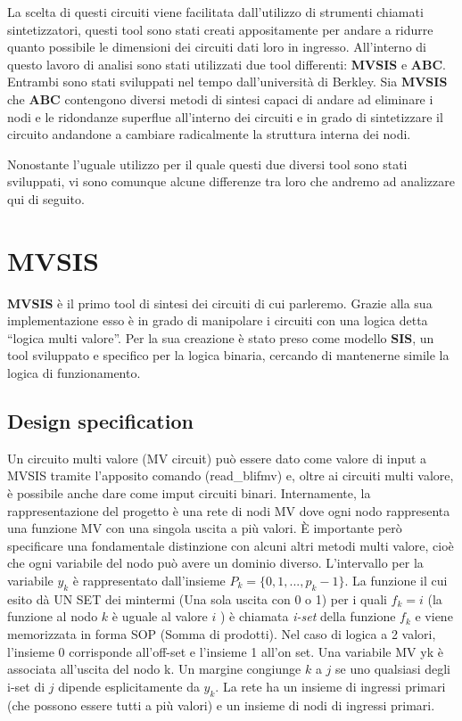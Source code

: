 \documentclass[
  italian,
]{book}
\begin{document}
La scelta di questi circuiti viene facilitata dall'utilizzo di strumenti chiamati sintetizzatori, questi tool sono stati creati appositamente per andare a ridurre quanto possibile le dimensioni dei circuiti dati loro in ingresso. All'interno di questo lavoro di analisi sono stati utilizzati due tool differenti: \textbf{MVSIS} e \textbf{ABC}. Entrambi sono stati sviluppati nel tempo dall'università di Berkley. Sia \textbf{MVSIS} che \textbf{ABC} contengono diversi metodi di sintesi capaci di andare ad eliminare i nodi e le ridondanze superflue all'interno dei circuiti e in grado di sintetizzare il circuito andandone a cambiare radicalmente la struttura interna dei nodi.

Nonostante l'uguale utilizzo per il quale questi due diversi tool sono stati sviluppati, vi sono comunque alcune differenze tra loro che andremo ad analizzare qui di seguito.

\newpage

\hypertarget{mvsis}{%
\section{MVSIS}\label{mvsis}}

\textbf{MVSIS} è il primo tool di sintesi dei circuiti di cui parleremo. Grazie alla sua implementazione esso è in grado di manipolare i circuiti con una logica detta ``logica multi valore''. Per la sua creazione è stato preso come modello \textbf{SIS}, un tool sviluppato e specifico per la logica binaria, cercando di mantenerne simile la logica di funzionamento.

\hypertarget{design-specification}{%
\subsection{Design specification}\label{design-specification}}

Un circuito multi valore (MV circuit) può essere dato come valore di input a MVSIS tramite l'apposito comando (read\_blifmv) e, oltre ai circuiti multi valore, è possibile anche dare come imput circuiti binari. Internamente, la rappresentazione del progetto è una rete di nodi MV dove ogni nodo rappresenta una funzione MV con una singola uscita a più valori. È importante però specificare una fondamentale distinzione con alcuni altri metodi multi valore, cioè che ogni variabile del nodo può avere un dominio diverso. L'intervallo per la variabile \(y_k\) è rappresentato dall'insieme \(P_k=\{0,1,...,p_k -1 \}\). La funzione il cui esito dà UN SET dei mintermi (Una sola uscita con 0 o 1) per i quali \(f_k = i\) (la funzione al nodo \(k\) è uguale al valore \(i\) ) è chiamata \emph{i-set} della funzione \(f_k\) e viene memorizzata in forma SOP (Somma di prodotti). Nel caso di logica a 2 valori, l'insieme 0 corrisponde all'off-set e l'insieme 1 all'on set. Una variabile MV yk è associata all'uscita del nodo k. Un margine congiunge \(k\) a \(j\) se uno qualsiasi degli i-set di \(j\) dipende esplicitamente da \(y_k\). La rete ha un insieme di ingressi primari (che possono essere tutti a più valori) e un insieme di nodi di ingressi primari.
\end{document}
